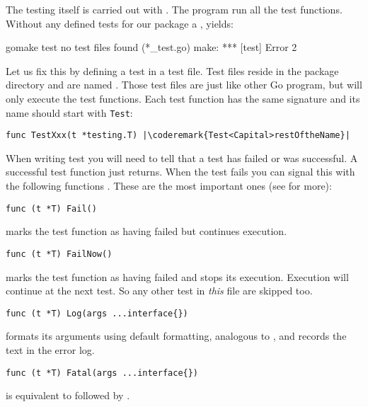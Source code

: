 
The testing itself is carried out with .
The  program run all the test functions. Without any
defined tests for our  package a , yields:
\begin{display}
\pr gomake test
no test files found (*_test.go)
make: *** [test] Error 2
\end{display}
Let us fix this by defining a test in a test file. Test files reside
in the package directory and are named . Those test
files are just like other Go program, but  will only
execute the test functions.
Each test function has the same signature and its name should start
with \lstinline{Test}:
\begin{lstlisting}
func TestXxx(t *testing.T) |\coderemark{Test<Capital>restOftheName}|
\end{lstlisting}

When writing test you will need to tell  that a test has
failed or was successful. A successful test function just returns. When
the test fails you can signal this with the following
functions \cite{go_doc}. These are the most important ones (see 
for more):

\begin{lstlisting}[numbers=none]
func (t *T) Fail()
\end{lstlisting}
 marks the test function as having failed but continues execution.

\begin{lstlisting}[numbers=none]
func (t *T) FailNow()
\end{lstlisting}
 marks the test function as having failed and stops its execution.
Execution will continue at the next test. So any other test in
\emph{this} file are skipped too.

\begin{lstlisting}[numbers=none]
func (t *T) Log(args ...interface{})
\end{lstlisting}
 formats its arguments using default formatting, analogous to
, and records the text in the error log.

\begin{lstlisting}[numbers=none]
func (t *T) Fatal(args ...interface{})
\end{lstlisting}
 is equivalent to  followed by .

